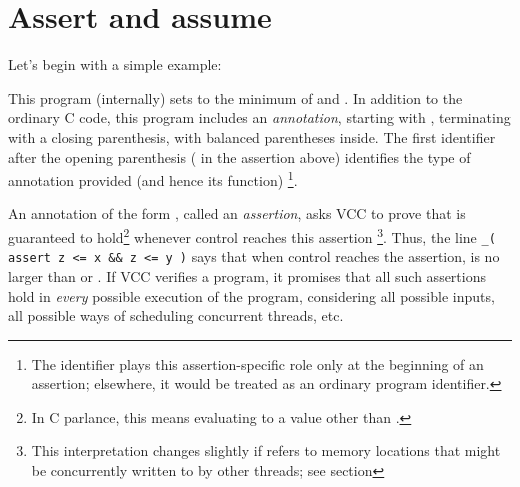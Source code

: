 \section{Assert and assume}
\label{sect:assert-assume}


Let's begin with a simple example:

This program (internally) sets  to the minimum of  and
. In addition to the ordinary C code, this program includes an
\emph{annotation}, starting with \vcc{_(}, terminating with a closing
parenthesis, with balanced parentheses inside. The first identifier
after the opening parenthesis ( in the assertion above)
identifies the type of annotation provided (and hence its function)%
\footnote{The identifier plays this assertion-specific role only 
at the beginning of an assertion; elsewhere, it would be treated as
an ordinary program identifier. }.

An annotation of the form , called an \emph{assertion}, asks VCC to prove that
 is guaranteed to hold\footnote{
  In C parlance, this means evaluating to a value other than .
} whenever control reaches this assertion \footnote{
  This interpretation changes slightly if  refers to
  memory locations that might be concurrently written to by other
  threads; see section }.  
Thus, the line \lstinline|_( assert z <= x && z <= y )| says
that when control reaches the assertion,  is no larger than  or
. If VCC verifies a program, it promises that all such assertions
hold in \emph{every} possible execution of the program, considering all possible inputs,
all possible ways of scheduling concurrent threads, etc. 

